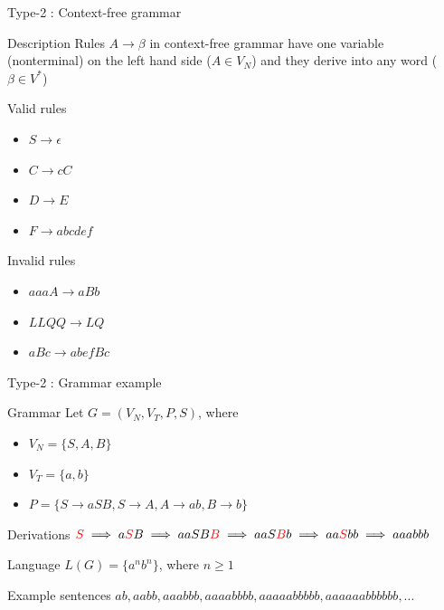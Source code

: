 \documentclass{beamer}
\begin{document}
\begin{frame}{Type-2 : Context-free grammar}
	
	\begin{block}{Description}
		Rules $A \rightarrow \beta$ in context-free grammar have one variable (nonterminal) on the left hand side ($A\in V_N$) and they derive into any word ($\beta \in V^*$)
	\end{block}
	
	\begin{exampleblock}{Valid rules}
		\begin{itemize}
			\item $S \rightarrow \epsilon$
			\item $C \rightarrow cC$
			\item $D \rightarrow E$
			\item $F \rightarrow abcdef$
		\end{itemize}
	\end{exampleblock}
	
	\begin{alertblock}{Invalid rules}
		\begin{itemize}
			\item $aaaA \rightarrow aBb$
			\item $LLQQ \rightarrow LQ$
			\item $aBc \rightarrow abefBc$			
		\end{itemize}
	\end{alertblock}
	
\end{frame}


\begin{frame}{Type-2 : Grammar example}
	\begin{block}{Grammar}
		Let $G = (V_N, V_T, P, S)$, where 
		\begin{itemize}
			\item $V_N = \{S, A, B\}$
			\item $V_T = \{a, b\}$
			\item $P = \{S\rightarrow aSB, S\rightarrow A, A \rightarrow ab, B\rightarrow b\}$
		\end{itemize}
	\end{block}
	
	\begin{block}{Derivations}
		$\textcolor{red}{S}\implies a\textcolor{red}{S}B \implies aaSB\textcolor{red}{B} \implies aaS\textcolor{red}{B}b \implies aa\textcolor{red}{S}bb \implies aaabbb$
	\end{block}
	
	\begin{block}{Language}
		$L(G) = \{a^nb^n\}$, where $n\geq 1$
	\end{block}
	
	\begin{exampleblock}{Example sentences}
		$ab, aabb, aaabbb, aaaabbbb, aaaaabbbbb, aaaaaabbbbbb, ...$
	\end{exampleblock}
\end{frame}
\end{document}
